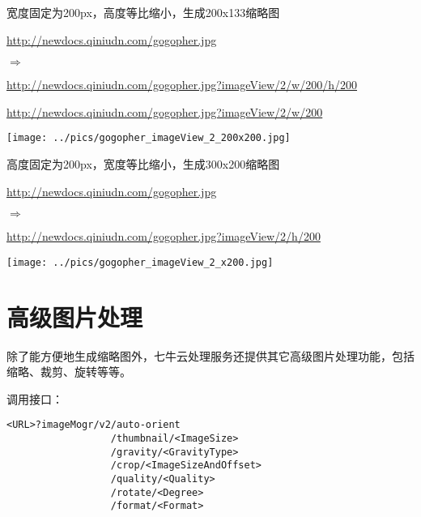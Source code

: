 \documentclass[11pt, oneside]{book}
\newcommand{\qsym}[1]{
\footnotesize
\noindent
#1\par
\normalsize
}
\newcommand{\qpara}[1]{
\vspace{0.3em}
\noindent
#1\par
\vspace{0.3em}
}
\newcommand{\qsamplelink}[1]{
\vspace{0.2em}
\noindent
#1\par
\vspace{0.1em}
}
\newcommand{\qurl}[1]{\footnotesize\url{#1}\normalsize}
\begin{document}
\begin{sample}
  \caption{宽度固定为200px，高度等比缩小，生成200x133缩略图}
    \qsamplelink{\qurl{http://newdocs.qiniudn.com/gogopher.jpg}}
    \qsym{$\Rightarrow$}
    \qsamplelink{\qurl{http://newdocs.qiniudn.com/gogopher.jpg?imageView/2/w/200/h/200}}
    \qsamplelink{\qurl{http://newdocs.qiniudn.com/gogopher.jpg?imageView/2/w/200}}

    \begin{center}
      \texttt{[image: ../pics/gogopher\_imageView\_2\_200x200.jpg]}
    \end{center}
  \label{imageView-2-200x200}
\end{sample}

\begin{sample}
  \caption{高度固定为200px，宽度等比缩小，生成300x200缩略图}
    \qsamplelink{\qurl{http://newdocs.qiniudn.com/gogopher.jpg}}
    \qsym{$\Rightarrow$}
    \qsamplelink{\qurl{http://newdocs.qiniudn.com/gogopher.jpg?imageView/2/h/200}}

    \begin{center}
      \texttt{[image: ../pics/gogopher\_imageView\_2\_x200.jpg]}
    \end{center}
  \label{imageView-2-x200}
\end{sample}

\clearpage

\section{高级图片处理}

\qpara{除了能方便地生成缩略图外，七牛云处理服务还提供其它高级图片处理功能，包括缩略、裁剪、旋转等等。}
\qpara{调用接口：}
\begin{lstlisting}
<URL>?imageMogr/v2/auto-orient
                  /thumbnail/<ImageSize>
                  /gravity/<GravityType>
                  /crop/<ImageSizeAndOffset>
                  /quality/<Quality>
                  /rotate/<Degree>
                  /format/<Format>
\end{lstlisting}
\end{document}
